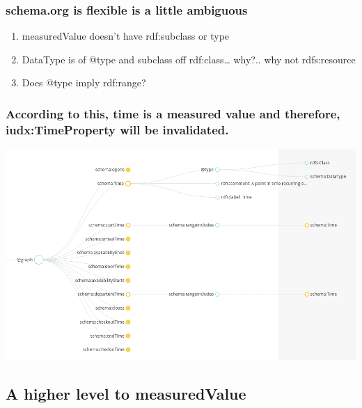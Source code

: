 \documentclass[11pt]{article}
\begin{document}
\subsubsection{schema.org is flexible is a little ambiguous}
\label{sec:org496e023}
\begin{enumerate}
\item measuredValue doesn't have rdf:subclass or type
\label{sec:orga4a467f}
\item DataType is of @type and subclass off rdf:class\ldots{} why?.. why not rdfs:resource
\label{sec:org39dc05b}
\item Does @type imply rdf:range?
\label{sec:org39f9b62}
\end{enumerate}

\subsubsection{According to this, time is a measured value and therefore, iudx:TimeProperty will be invalidated.}
\label{sec:orgb470604}
\begin{center}
\includegraphics[width=.9\linewidth]{./time.png}
\end{center}

\subsection{A higher level to measuredValue}
\label{sec:org8dc621d}
\end{document}
